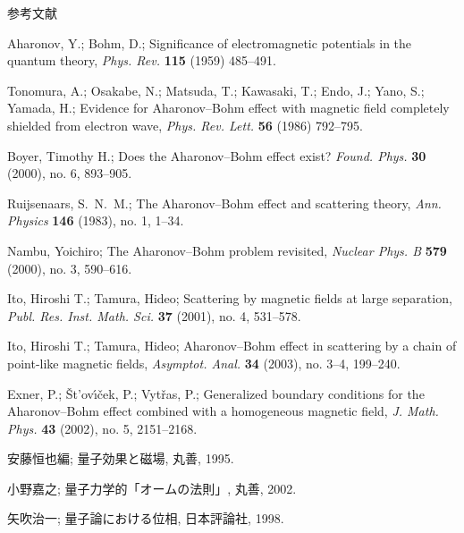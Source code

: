 \documentclass[uplatex,dvipdfmx]{jlreq}
\begin{document}
\begin{center}\textsc{参考文献}\end{center}
\begin{enumerate}[{[1]}]
\item
Aharonov, Y.; Bohm, D.;
Significance of electromagnetic potentials in the quantum theory,
\textit{Phys. Rev.} \textbf{115} (1959) 485--491.

\item
Tonomura, A.;
Osakabe, N.;
Matsuda, T.;
Kawasaki, T.;
Endo, J.;
Yano, S.;
Yamada, H.;
Evidence for Aharonov--Bohm effect with magnetic field
completely shielded from electron wave,
\textit{Phys. Rev. Lett.} \textbf{56} (1986) 792--795.

\item
Boyer, Timothy H.;
Does the Aharonov--Bohm effect exist?
\textit{Found. Phys.} \textbf{30} (2000), no. 6, 893--905.

\item
Ruijsenaars, S.~N.~M.;
The Aharonov--Bohm effect and scattering theory,
\textit{Ann. Physics} \textbf{146} (1983), no. 1, 1--34.

\item
Nambu, Yoichiro;
The Aharonov--Bohm problem revisited,
\textit{Nuclear Phys. B} \textbf{579} (2000), no. 3, 590--616.

\item
Ito, Hiroshi T.; Tamura, Hideo;
Scattering by magnetic fields at large separation,
\textit{Publ. Res. Inst. Math. Sci.} \textbf{37} (2001), no. 4, 531--578.

\item
Ito, Hiroshi T.; Tamura, Hideo;
Aharonov--Bohm effect in scattering by a chain of
point-like magnetic fields,
\textit{Asymptot. Anal.} \textbf{34} (2003), no. 3--4, 199--240.

\item
Exner, P.; {\v S}t'ov\'{\i}{\v c}ek, P.; Vyt{\v r}as, P.;
Generalized boundary conditions for the Aharonov--Bohm effect combined
with a homogeneous magnetic field,
\textit{J. Math. Phys.} \textbf{43} (2002), no. 5, 2151--2168.

\item
安藤恒也編;
量子効果と磁場,
丸善, 1995.

\item
小野嘉之;
量子力学的「オームの法則」,
丸善, 2002.

\item
矢吹治一;
量子論における位相,
日本評論社, 1998.
\end{enumerate}
\end{document}
